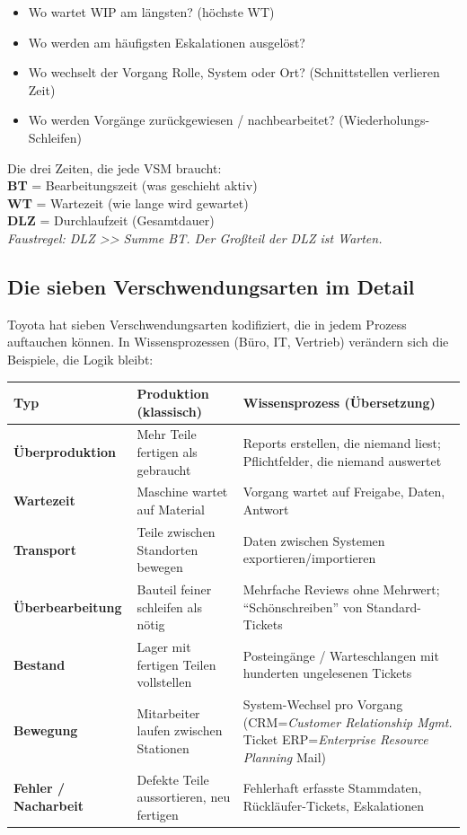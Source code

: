 \documentclass[11pt,a4paper,oneside]{article}
\newcommand{\caveatfontfallback}{\itshape}
\newcommand\caveatfont{\caveatfontfallback}%
\newcommand{\akzent}[1]{{\caveatfont\color{lpAmber}#1}}
\begin{document}
\begin{itemize}
  \item Wo wartet WIP am längsten? (höchste WT)
  \item Wo werden am häufigsten Eskalationen ausgelöst?
  \item Wo wechselt der Vorgang Rolle, System oder Ort? (Schnittstellen verlieren Zeit)
  \item Wo werden Vorgänge zurückgewiesen / nachbearbeitet? (Wiederholungs-Schleifen)
\end{itemize}

\begin{eselsbox}[Eselsbrücke: \akzent{BT-WT-DLZ}]
Die drei Zeiten, die jede VSM braucht:\\[2pt]
\textbf{BT} = Bearbeitungszeit (was geschieht aktiv)\\
\textbf{WT} = Wartezeit (wie lange wird gewartet)\\
\textbf{DLZ} = Durchlaufzeit (Gesamtdauer)\\[2pt]
\emph{Faustregel: DLZ \textgreater\textgreater{} Summe BT. Der Großteil der DLZ ist Warten.}
\end{eselsbox}

\subsection{Die sieben Verschwendungsarten im Detail}

Toyota hat sieben Verschwendungsarten kodifiziert, die in jedem Prozess auftauchen können. In Wissensprozessen (Büro, IT, Vertrieb) verändern sich die Beispiele, die Logik bleibt:

\begin{tabularx}{\linewidth}{@{}>{\bfseries}lX X@{}}
\toprule
Typ & Produktion (klassisch) & Wissensprozess (Übersetzung) \\
\midrule
Überproduktion & Mehr Teile fertigen als gebraucht & Reports erstellen, die niemand liest; Pflichtfelder, die niemand auswertet \\
Wartezeit & Maschine wartet auf Material & Vorgang wartet auf Freigabe, Daten, Antwort \\
Transport & Teile zwischen Standorten bewegen & Daten zwischen Systemen exportieren/importieren \\
Überbearbeitung & Bauteil feiner schleifen als nötig & Mehrfache Reviews ohne Mehrwert; ``Schönschreiben'' von Standard-Tickets \\
Bestand & Lager mit fertigen Teilen vollstellen & Posteingänge / Warteschlangen mit hunderten ungelesenen Tickets \\
Bewegung & Mitarbeiter laufen zwischen Stationen & System-Wechsel pro Vorgang (CRM=\emph{Customer Relationship Mgmt.} \textrightarrow{} Ticket \textrightarrow{} ERP=\emph{Enterprise Resource Planning} \textrightarrow{} Mail) \\
Fehler / Nacharbeit & Defekte Teile aussortieren, neu fertigen & Fehlerhaft erfasste Stammdaten, Rückläufer-Tickets, Eskalationen \\
\bottomrule
\end{tabularx}
\end{document}
